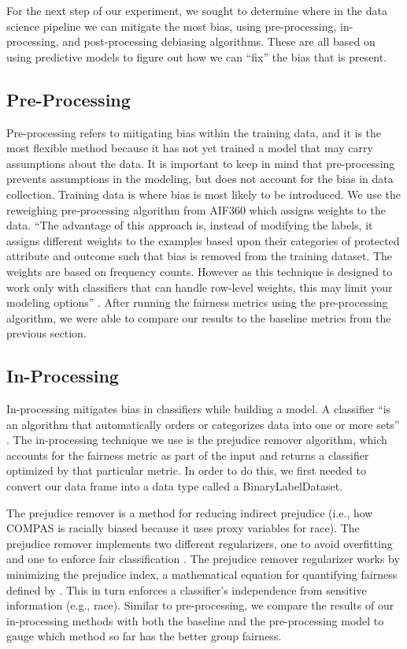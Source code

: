 \documentclass[,article,,moreauthors,pdftex]{mdpi}
\begin{document}
For the next step of our experiment, we sought to determine where in the
data science pipeline we can mitigate the most bias, using
pre-processing, in-processing, and post-processing debiasing algorithms.
These are all based on using predictive models to figure out how we can
``fix'' the bias that is present.

\hypertarget{pre-processing}{%
\subsection{Pre-Processing}\label{pre-processing}}

Pre-processing refers to mitigating bias within the training data, and
it is the most flexible method because it has not yet trained a model
that may carry assumptions about the data. It is important to keep in
mind that pre-processing prevents assumptions in the modeling, but does
not account for the bias in data collection. Training data is where bias
is most likely to be introduced. We use the reweighing pre-processing
algorithm from AIF360 which assigns weights to the data. ``The advantage
of this approach is, instead of modifying the labels, it assigns
different weights to the examples based upon their categories of
protected attribute and outcome such that bias is removed from the
training dataset. The weights are based on frequency counts. However as
this technique is designed to work only with classifiers that can handle
row-level weights, this may limit your modeling options''
\citep{Ronaghan2019AI}. After running the fairness metrics using the
pre-processing algorithm, we were able to compare our results to the
baseline metrics from the previous section.

\hypertarget{in-processing}{%
\subsection{In-Processing}\label{in-processing}}

In-processing mitigates bias in classifiers while building a model. A
classifier ``is an algorithm that automatically orders or categorizes
data into one or more sets'' \citep{baxter2021AI}. The in-processing
technique we use is the prejudice remover algorithm, which accounts for
the fairness metric as part of the input and returns a classifier
optimized by that particular metric. In order to do this, we first
needed to convert our data frame into a data type called a
BinaryLabelDataset.

The prejudice remover is a method for reducing indirect prejudice (i.e.,
how COMPAS is racially biased because it uses proxy variables for race).
The prejudice remover implements two different regularizers, one to
avoid overfitting and one to enforce fair classification
\citep{kamishima2012fairness}. The prejudice remover regularizer works
by minimizing the prejudice index, a mathematical equation for
quantifying fairness defined by \citet{kamishima2012fairness}. This in
turn enforces a classifier's independence from sensitive information
(e.g., race). Similar to pre-processing, we compare the results of our
in-processing methods with both the baseline and the pre-processing
model to gauge which method so far has the better group fairness.
\end{document}
